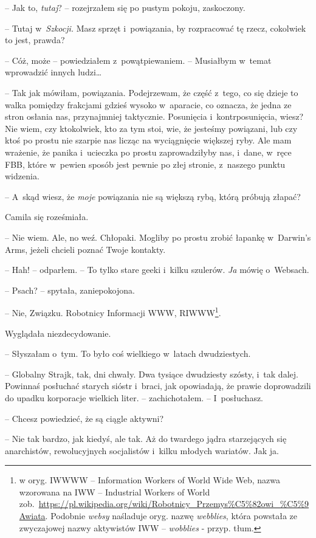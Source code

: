 \documentclass[oneside,polish,12pt,sfheadings]{mwbk}
\begin{document}
-- Jak to, \emph{tutaj}? -- rozejrzałem się po pustym pokoju, zaskoczony.

-- Tutaj w~\emph{Szkocji. } Masz sprzęt i~powiązania, by rozpracować tę
rzecz, cokolwiek to jest, prawda?

-- Cóż, może -- powiedziałem z~powątpiewaniem. -- Musiałbym w~temat
wprowadzić innych ludzi\ldots

-- Tak jak mówiłam, powiązania. Podejrzewam, że część z~tego, co się
dzieje to walka pomiędzy frakcjami gdzieś wysoko w~aparacie, co oznacza,
że jedna ze stron osłania nas, przynajmniej taktycznie. Posunięcia i~kontrposunięcia, wiesz? Nie wiem, czy ktokolwiek, kto za tym stoi, wie,
że jesteśmy powiązani, lub czy ktoś po prostu nie szarpie nas licząc na
wyciągnięcie większej ryby. Ale mam wrażenie, że panika i~ucieczka po
prostu zaprowadziłyby nas, i~dane, w~ręce FBB, które w~pewien sposób
jest pewnie po złej stronie, z~naszego punktu widzenia.

-- A~skąd wiesz, że \emph{moje} powiązania nie są większą rybą, którą
próbują złapać?

Camila się roześmiała. 

-- Nie wiem. Ale, no weź. Chłopaki. Mogliby po
prostu zrobić łapankę w~Darwin's Arms, jeżeli chcieli poznać Twoje
kontakty.

-- Hah! -- odparłem. -- To tylko stare geeki i~kilku szulerów. \emph{Ja}
mówię o~Websach.

-- Psach? -- spytała, zaniepokojona.

-- Nie, Związku. Robotnicy Informacji WWW, RIWWW\footnote{w oryg. IWWWW -- Information Workers of World Wide Web, nazwa wzorowana na IWW -- Industrial Workers of World zob.~\url{https://pl.wikipedia.org/wiki/Robotnicy_Przemys\%C5\%82owi_\%C5\%9Awiata}. Podobnie \emph{websy} naśladuje oryg. nazwę \emph{webblies}, która powstała ze zwyczajowej nazwy aktywistów IWW -- \emph{wobblies} - przyp. tłum.}.


Wyglądała niezdecydowanie. 

-- Słyszałam o~tym. To było coś wielkiego w~latach dwudziestych.

-- Globalny Strajk, tak, dni chwały. Dwa tysiące dwudziesty szósty, i~tak
dalej. Powinnaś posłuchać starych sióstr i~braci, jak opowiadają, że
prawie doprowadzili do upadku korporacje wielkich liter. --
zachichotałem. -- I~posłuchasz.

-- Chcesz powiedzieć, że są ciągle aktywni?

-- Nie tak bardzo, jak kiedyś, ale tak. Aż do twardego jądra starzejących
się anarchistów, rewolucyjnych socjalistów i~kilku młodych wariatów. Jak
ja.
\end{document}
